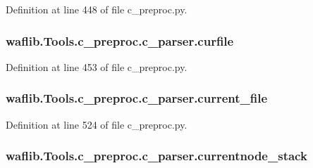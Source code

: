Definition at line 448 of file c\+\_\+preproc.\+py.

\subsubsection[{\texorpdfstring{curfile}{curfile}}]{\setlength{\rightskip}{0pt plus 5cm}waflib.\+Tools.\+c\+\_\+preproc.\+c\+\_\+parser.\+curfile}\hypertarget{classwaflib_1_1_tools_1_1c__preproc_1_1c__parser_aa314d9c7a0ef9ab160fbfb13bf391143}{}\label{classwaflib_1_1_tools_1_1c__preproc_1_1c__parser_aa314d9c7a0ef9ab160fbfb13bf391143}


Definition at line 453 of file c\+\_\+preproc.\+py.

\subsubsection[{\texorpdfstring{current\+\_\+file}{current_file}}]{\setlength{\rightskip}{0pt plus 5cm}waflib.\+Tools.\+c\+\_\+preproc.\+c\+\_\+parser.\+current\+\_\+file}\hypertarget{classwaflib_1_1_tools_1_1c__preproc_1_1c__parser_aabab8961df62f9823fe7fd5409753bf0}{}\label{classwaflib_1_1_tools_1_1c__preproc_1_1c__parser_aabab8961df62f9823fe7fd5409753bf0}


Definition at line 524 of file c\+\_\+preproc.\+py.

\subsubsection[{\texorpdfstring{currentnode\+\_\+stack}{currentnode_stack}}]{\setlength{\rightskip}{0pt plus 5cm}waflib.\+Tools.\+c\+\_\+preproc.\+c\+\_\+parser.\+currentnode\+\_\+stack}\hypertarget{classwaflib_1_1_tools_1_1c__preproc_1_1c__parser_aeeef004b9f676b1aa95008bc6a467e91}{}\label{classwaflib_1_1_tools_1_1c__preproc_1_1c__parser_aeeef004b9f676b1aa95008bc6a467e91}


